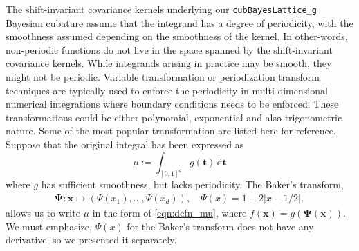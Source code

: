 \documentclass{iitthesis}          %
\newcommand{\bm}[1]{\boldsymbol{#1}}
\newcommand{\dif}[1]{\text{d}{#1}}
\newcommand{\vt}{\bm{t}}
\newcommand{\vx}{\bm{x}}
\newcommand{\vPsi}{\boldsymbol{\Psi}}
\newcommand{\code}[1]{\texttt{#1}}
\def\abs#1{\ensuremath{\left \lvert #1 \right \rvert}}
\begin{document}
The shift-invariant covariance kernels underlying our \code{cubBayesLattice\_g} \\
Bayesian cubature  assume that the integrand has a degree of periodicity, with the smoothness assumed depending on the smoothness of the kernel.  
In other-words, non-periodic functions do not live in the space spanned by the shift-invariant covariance kernels.
While integrands arising in practice may be smooth, they might not be periodic.  
Variable transformation or periodization transform techniques are typically used to enforce the periodicity in multi-dimensional numerical integrations where boundary conditions needs to be enforced. These transformations could be either polynomial, exponential and also trigonometric nature.
Some of the most popular transformation are listed here for reference. 
Suppose that the original integral has been expressed as 
\begin{equation*}
\mu := \int_{[0,1]^d} g(\vt) \, \dif \vt
\end{equation*}
where $g$ has sufficient smoothness, but lacks periodicity.  The Baker's transform,
\begin{align} \label{eq:bakerTrans}
\vPsi: \vx \mapsto (\Psi(x_1),  \ldots, \Psi(x_d)),  \quad \Psi(x)  =1 - 2 \abs{x - 1/2},
\end{align}
allows us to write $\mu$ in the form of \eqref{eqn:defn_mu}, where $f(\vx) = g(\vPsi(\vx))$.  We must emphasize, $\Psi(x)$ for the Baker's transform does not have any derivative, so we presented it separately.
\end{document}

